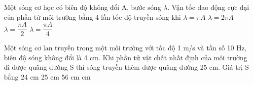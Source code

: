 \begin{vidu} %
Một sóng cơ học có biên độ không đổi A, bước sóng $\lambda$. Vận tốc dao động cực đại của phần tử môi trường bằng 4 lần tốc độ truyền sóng khi
\choice
{$\lambda =\pi A$}
{$\lambda =2\pi A$}
{\True $\lambda =\dfrac{\pi A}{2}$}
{$\lambda =\dfrac{\pi A}{4}$}
\end{vidu} 
\begin{vidu}%
Một sóng cơ lan truyền trong một môi trường với tốc độ 1 m/s và tần số 10 Hz, biên độ sóng không đổi là 4 cm. Khi phần tử vật chất nhất định của môi trường đi được quãng đường S thì sóng truyền thêm được quãng đường 25 cm. Giá trị S bằng
\choice
{24 cm}
{25 cm}
{56 cm}
{ cm}
\end{vidu} 













